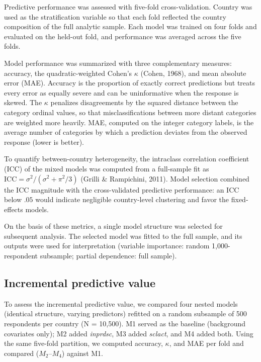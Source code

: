 \documentclass[12pt]{article}
\newcommand{\code}[1]{\textit{#1}}
\begin{document}
Predictive performance was assessed with five-fold cross-validation. Country was used as the stratification 
variable so that each fold reflected the country composition of the full analytic sample. Each model was 
trained on four folds and evaluated on the held-out fold, and performance was averaged across the five folds.

Model performance was summarized with three complementary measures: accuracy, the
quadratic-weighted Cohen's $\kappa$ (Cohen, 1968), and mean absolute error (MAE). Accuracy
is the proportion of exactly correct predictions but treats every error as equally severe and
can be uninformative when the response is skewed. The $\kappa$ penalizes disagreements
by the squared distance between the category ordinal values, so that misclassifications
between more distant categories are weighted more heavily. MAE, computed on the integer category
labels, is the average number of categories by which a prediction deviates from the observed
response (lower is better). 

To quantify between-country heterogeneity, the intraclass correlation coefficient (ICC) of
the mixed models was computed from a full-sample fit as
$\mathrm{ICC} = \sigma^{2} / \left(\sigma^{2} + \pi^{2}/3\right)$ (Grilli \& Rampichini,
2011). Model selection combined the ICC magnitude with
the cross-validated predictive performance: an ICC below $.05$ would indicate
negligible country-level clustering and favor the fixed-effects models.

On the basis of these metrics, a single model structure was selected for subsequent analysis. 
The selected model was fitted to the full sample, and its outputs were used for interpretation 
(variable importance: random 1,000-respondent subsample; partial dependence: full sample).

\subsection{Incremental predictive value}

To assess the incremental predictive value, we compared four nested models (identical structure, varying predictors)
refitted on a random subsample of 500 respondents per country (N = 10,500). M1 served as the baseline (background covariates only);
M2 added \code{inprdsc}, M3 added \code{sclact}, and M4 added both. Using the same five-fold partition, we computed accuracy, 
$\kappa$, and MAE per fold and compared ($M_2$--$M_4$) against M1.
\end{document}
